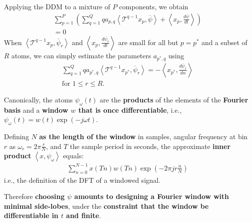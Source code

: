 \documentclass[plainsections,landscape]{sciposter}
\newcommand{\myinnercolsep}{1cm}
\newcommand{\mytcbtitlewrap}[1]{{\parbox[bottom][1.5cm][c]{\linewidth}{#1}}}
\begin{document}
\begin{multicols}{3}
\begin{tcolorbox}[title=\mytcbtitlewrap{Estimating the
    \lowercase{$a_{p,q}$} of $P$ components}]
\begin{multicols}{2}
Applying the DDM to a mixture of $P$ components, we
    obtain\footnotemark[1]%
%
\begin{multline}
    \label{eq:mixest}
    \sum_{p=1}^{P} \left(
    \sum_{q=1}^{Q} q a_{p,q} 
    \left\langle \mathcal{T}^{q-1} x_{p} , \overline{\psi} \right\rangle
    + \left\langle x_{p}, \frac{d\overline{\psi}}{dt} \right\rangle \right)
    \\
    = 0
\end{multline}
%
When $\left\langle \mathcal{T}^{q-1} x_{p} , \overline{\psi}_{r}
\right\rangle$ and $\left\langle x_{p}, \frac{d\overline{\psi_{r}}}{dt} \right\rangle$
are small for all but $p = p^{\ast}$ and a subset of $R$ atoms, we can simply
    estimate the parameters $a_{p^{\ast},q}$ using%
    \footnotemark[2]%
\begin{multline}
    \sum_{q=1}^{Q} q a_{{p^{\ast}},q} 
    \left\langle \mathcal{T}^{q-1} x_{p^{\ast}} , \overline{\psi}_{r} \right\rangle
    = -\left\langle x_{p^{\ast}}, \frac{d\overline{\psi}_{r}}{dn}
    \right\rangle\\
    \text{for } 1 \leq r \leq R\text{.}
\end{multline}
\end{multicols}
\end{tcolorbox}

\begin{tcolorbox}[title=\mytcbtitlewrap{Designing the $\psi_{r}$}]
\setlength{\columnsep}{\myinnercolsep}
\begin{multicols}{2}
\label{sec:designingatoms}
%
Canonically, the atoms $\psi_{\omega}(t)$ 
    are the \textbf{products} of the elements of the \textbf{Fourier basis} and a 
    \textbf{window $w$ that is once differentiable}, i.e.,
    $\psi_{\omega}(t) = w(t) \exp(-j \omega t)$.

    Defining $N$ \textbf{as the length of the window} in samples, angular frequency at bin $r$ as $\omega_{r} = 2
\pi \frac{r}{N}$, and $T$ the sample period in seconds, the approximate
    \textbf{inner product} $\left\langle x , \psi_{\omega}
    \right\rangle$ equals:
\begin{multline}
    \label{eq:approxinnerprod}
    \sum_{n=0}^{N-1} x(Tn) w(Tn) \exp(-2 \pi j r \frac{n}{N}) 
\end{multline}
i.e., the definition of the DFT of a windowed signal.
\columnbreak

Therefore \textbf{choosing $\psi$ amounts to
    designing a Fourier window with minimal side-lobes}, under the \textbf{constraint
    that the window be differentiable in $t$ and finite}.
\end{multicols}
\end{tcolorbox}


\end{multicols}
\end{document}
